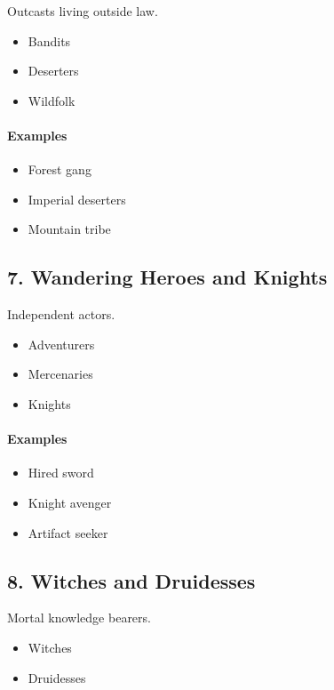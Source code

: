 Outcasts living outside law.

\begin{itemize}
\item Bandits
\item Deserters
\item Wildfolk
\end{itemize}

\paragraph{Examples}
\begin{itemize}
\item Forest gang
\item Imperial deserters
\item Mountain tribe
\end{itemize}



\subsection{7. Wandering Heroes and Knights}

Independent actors.

\begin{itemize}
\item Adventurers
\item Mercenaries
\item Knights
\end{itemize}

\paragraph{Examples}
\begin{itemize}
\item Hired sword
\item Knight avenger
\item Artifact seeker
\end{itemize}



\subsection{8. Witches and Druidesses}

Mortal knowledge bearers.

\begin{itemize}
\item Witches
\item Druidesses
\end{itemize}

